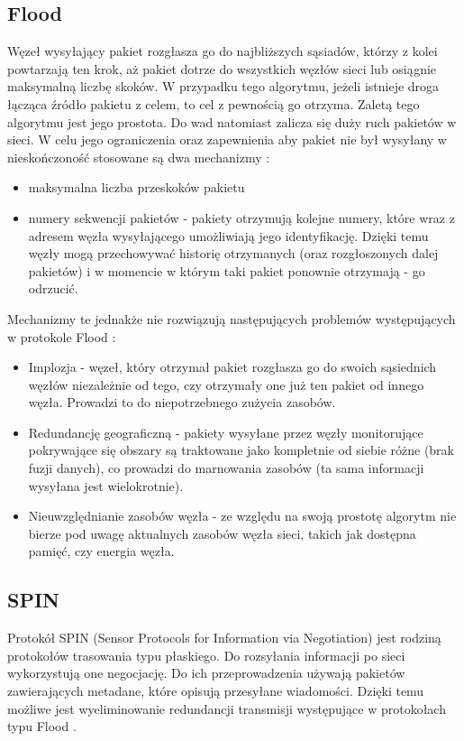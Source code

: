 \subsection{Flood}\label{subsec:flood}
Węzeł wysyłający pakiet rozgłasza go do najbliższych sąsiadów, którzy z kolei powtarzają ten krok, aż pakiet dotrze do wszystkich węzłów sieci lub osiągnie maksymalną liczbę skoków.
W przypadku tego algorytmu, jeżeli istnieje droga łącząca źródło pakietu z celem, to cel z pewnością go otrzyma.
Zaletą tego algorytmu jest jego prostota. Do wad natomiast zalicza się duży ruch pakietów w sieci. W celu jego ograniczenia oraz zapewnienia aby pakiet nie był wysyłany w nieskończoność stosowane są dwa mechanizmy \cite{Dargie2010}:
\begin{itemize}
	\item maksymalna liczba przeskoków pakietu
	\item numery sekwencji pakietów - pakiety otrzymują kolejne numery, które wraz z adresem węzła wysyłającego umożliwiają jego identyfikację. Dzięki temu węzły mogą przechowywać historię otrzymanych (oraz rozgłoszonych dalej pakietów) i w momencie w którym taki pakiet ponownie otrzymają - go odrzucić.
\end{itemize}

Mechanizmy te jednakże nie rozwiązują następujących problemów występujących w protokole Flood \cite{Dargie2010}:
\begin{itemize}
	\item Implozja - węzeł, który otrzymał pakiet rozgłasza go do swoich sąsiednich węzłów niezależnie od tego, czy otrzymały one już ten pakiet od innego węzła. Prowadzi to do niepotrzebnego zużycia zasobów. %
	\item Redundancję geograficzną - pakiety wysyłane przez węzły monitorujące pokrywające się obszary są traktowane jako kompletnie od siebie różne (brak fuzji danych), co prowadzi do marnowania zasobów (ta sama informacji wysyłana jest wielokrotnie). %
	\item Nieuwzględnianie zasobów węzła - ze względu na swoją prostotę algorytm nie bierze pod uwagę aktualnych zasobów węzła sieci, takich jak dostępna pamięć, czy energia węzła.
\end{itemize}
\subsection{SPIN}
Protokół SPIN (Sensor Protocols for Information via Negotiation) jest rodziną protokołów trasowania typu płaskiego. Do rozsyłania informacji po sieci wykorzystują one negocjację. Do ich przeprowadzenia używają pakietów zawierających metadane, które opisują przesyłane wiadomości. Dzięki temu możliwe jest wyeliminowanie redundancji transmisji występujące w protokołach typu Flood \cite{Chaudhary2015}.

